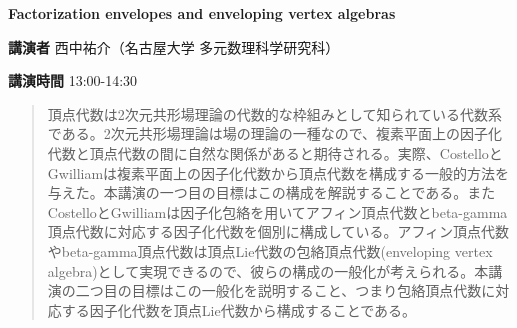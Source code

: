 \documentclass{ltjsarticle}
\theoremstyle{mystyle} %
\numberwithin{equation}{section}
\newcommand{\spkE}{西中祐介}
\newcommand{\instE}{名古屋大学 多元数理科学研究科}
\newcommand{\titleEE}{Factorization envelopes and enveloping vertex algebras}
\newcommand{\abst}[5]{
    \Large
    \textbf{#1}
    \normalsize
    
    \vspace{10pt}

    \textbf{講演者} #2（#3）

    \textbf{講演時間} #4

    \vspace{5pt}

    \begin{quote}
        #5
    \end{quote}

    \vspace{10pt}
}
\begin{document}
\abst{\titleEE}{\spkE}{\instE}{13:00-14:30}{
    頂点代数は2次元共形場理論の代数的な枠組みとして知られている代数系である。2次元共形場理論は場の理論の一種なので、複素平面上の因子化代数と頂点代数の間に自然な関係があると期待される。実際、CostelloとGwilliamは複素平面上の因子化代数から頂点代数を構成する一般的方法を与えた。本講演の一つ目の目標はこの構成を解説することである。またCostelloとGwilliamは因子化包絡を用いてアフィン頂点代数とbeta-gamma頂点代数に対応する因子化代数を個別に構成している。アフィン頂点代数やbeta-gamma頂点代数は頂点Lie代数の包絡頂点代数(enveloping vertex algebra)として実現できるので、彼らの構成の一般化が考えられる。本講演の二つ目の目標はこの一般化を説明すること、つまり包絡頂点代数に対応する因子化代数を頂点Lie代数から構成することである。
}
\end{document}
